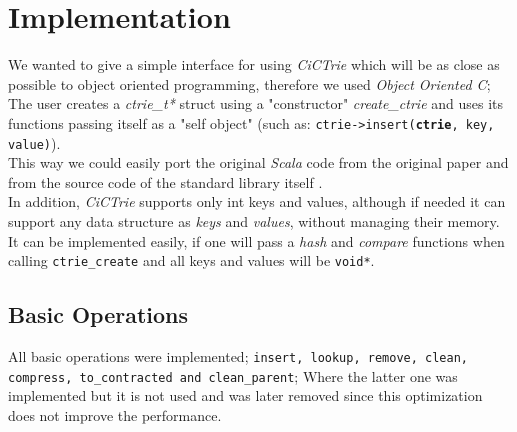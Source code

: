 \documentclass[conference]{IEEEtran}
\begin{document}
\section{Implementation}
	
	We wanted to give a simple interface for using \textit{CiCTrie}\cite{cictrie} which will be as close  as possible to object oriented programming, therefore we used \textit{Object Oriented C}; The user creates a \textit{ctrie\_t*} struct using a "constructor" \textit{create\_ctrie} and uses its functions passing itself as a "self object" (such as: \texttt{ctrie->insert(\textbf{ctrie}, key, value)}). \\
	This way we could easily port the original \textit{Scala} code from the original paper \cite{article} and from the source code of the standard library itself \cite{ctrie-scala-source-code}. \\
	In addition, \textit{CiCTrie} supports only int keys and values, although if needed it can support any data structure as \textit{keys} and \textit{values}, without managing their memory. It can be implemented easily, if one will pass a \textit{hash} and \textit{compare} functions when calling \texttt{ctrie\_create} and all keys and values will be \texttt{void*}.
	
\subsection{Basic Operations}
	All basic operations were implemented; \texttt{insert, lookup, remove, clean, compress, to\_contracted and clean\_parent}; Where the latter one was implemented but it is not used and was later removed since this optimization does not improve the performance.
	
\end{document}
